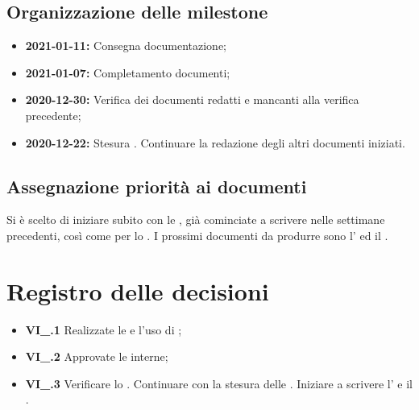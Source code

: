 \subsection{Organizzazione delle milestone}
 \begin{itemize}
  \item \textbf{2021-01-11:} Consegna documentazione;
  \item \textbf{2021-01-07:} Completamento documenti;
  \item \textbf{2020-12-30:} Verifica dei documenti redatti e mancanti alla verifica precedente;
  \item \textbf{2020-12-22:} Stesura \textit{\PdP}. Continuare la redazione degli altri documenti iniziati.
 \end{itemize}

\subsection{Assegnazione priorità ai documenti}
Si è scelto di iniziare subito con le \textit{\NdP}, già cominciate a scrivere nelle settimane precedenti, così come per lo \textit{\SdF}. I prossimi documenti da produrre sono l'\textit{\AdR} ed il \textit{\PdP}. 

\section{Registro delle decisioni}
\begin{itemize}
  \item \textbf{VI\_\Data.1} Realizzate le   e l'uso di ;
  \item \textbf{VI\_\Data.2} Approvate le  interne;
  \item \textbf{VI\_\Data.3} Verificare lo {\SdF}. Continuare con la stesura delle {\NdP}. Iniziare a scrivere l'{\AdR} e il \PdP.
\end{itemize}




